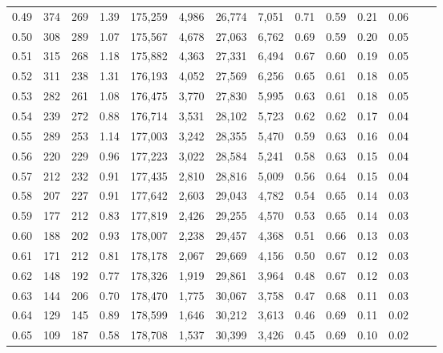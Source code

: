 \begin{tabular}{rrrrrrrrrrrrrr}
0.49 &     374 &  269 &    1.39 &  175,259 &    4,986 &  26,774 &   7,051 &  0.71 &  0.59 &  0.21 &      0.06 \\
0.50 &     308 &  289 &    1.07 &  175,567 &    4,678 &  27,063 &   6,762 &  0.69 &  0.59 &  0.20 &      0.05 \\
0.51 &     315 &  268 &    1.18 &  175,882 &    4,363 &  27,331 &   6,494 &  0.67 &  0.60 &  0.19 &      0.05 \\
0.52 &     311 &  238 &    1.31 &  176,193 &    4,052 &  27,569 &   6,256 &  0.65 &  0.61 &  0.18 &      0.05 \\
0.53 &     282 &  261 &    1.08 &  176,475 &    3,770 &  27,830 &   5,995 &  0.63 &  0.61 &  0.18 &      0.05 \\
0.54 &     239 &  272 &    0.88 &  176,714 &    3,531 &  28,102 &   5,723 &  0.62 &  0.62 &  0.17 &      0.04 \\
0.55 &     289 &  253 &    1.14 &  177,003 &    3,242 &  28,355 &   5,470 &  0.59 &  0.63 &  0.16 &      0.04 \\
0.56 &     220 &  229 &    0.96 &  177,223 &    3,022 &  28,584 &   5,241 &  0.58 &  0.63 &  0.15 &      0.04 \\
0.57 &     212 &  232 &    0.91 &  177,435 &    2,810 &  28,816 &   5,009 &  0.56 &  0.64 &  0.15 &      0.04 \\
0.58 &     207 &  227 &    0.91 &  177,642 &    2,603 &  29,043 &   4,782 &  0.54 &  0.65 &  0.14 &      0.03 \\
0.59 &     177 &  212 &    0.83 &  177,819 &    2,426 &  29,255 &   4,570 &  0.53 &  0.65 &  0.14 &      0.03 \\
0.60 &     188 &  202 &    0.93 &  178,007 &    2,238 &  29,457 &   4,368 &  0.51 &  0.66 &  0.13 &      0.03 \\
0.61 &     171 &  212 &    0.81 &  178,178 &    2,067 &  29,669 &   4,156 &  0.50 &  0.67 &  0.12 &      0.03 \\
0.62 &     148 &  192 &    0.77 &  178,326 &    1,919 &  29,861 &   3,964 &  0.48 &  0.67 &  0.12 &      0.03 \\
0.63 &     144 &  206 &    0.70 &  178,470 &    1,775 &  30,067 &   3,758 &  0.47 &  0.68 &  0.11 &      0.03 \\
0.64 &     129 &  145 &    0.89 &  178,599 &    1,646 &  30,212 &   3,613 &  0.46 &  0.69 &  0.11 &      0.02 \\
0.65 &     109 &  187 &    0.58 &  178,708 &    1,537 &  30,399 &   3,426 &  0.45 &  0.69 &  0.10 &      0.02 \\

\end{tabular}
